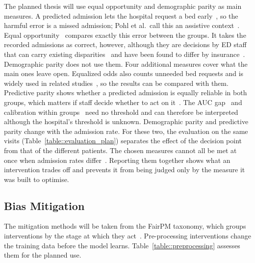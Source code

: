 The planned thesis will use equal opportunity and demographic parity as main measures. A predicted admission lets the hospital request a bed early~\cite{lett2025intersectional}, so the harmful error is a missed admission; Pohl et al.\ call this an assistive context~\cite{pohl2023discrimination}. Equal opportunity~\cite{hardt2016equality} compares exactly this error between the groups. It takes the recorded admissions as correct, however, although they are decisions by ED staff that can carry existing disparities~\cite{rajkomar2018ensuring} and have been found to differ by insurance~\cite{venkatesh2019association}. Demographic parity does not use them. Four additional measures cover what the main ones leave open. Equalized odds also counts unneeded bed requests and is widely used in related studies~\cite{liu2024faim,dasilva2025towards}, so the results can be compared with them. Predictive parity shows whether a predicted admission is equally reliable in both groups, which matters if staff decide whether to act on it~\cite{rajkomar2018ensuring}. The AUC gap~\cite{roosli2022peeking} and calibration within groups~\cite{pfohl2021empirical} need no threshold and can therefore be interpreted although the hospital's threshold is unknown. Demographic parity and predictive parity change with the admission rate. For these two, the evaluation on the same visits (Table~\ref{table::evaluation_plan}) separates the effect of the decision point from that of the different patients. The chosen measures cannot all be met at once when admission rates differ~\cite{paulus2020predictably}. Reporting them together shows what an intervention trades off and prevents it from being judged only by the measure it was built to optimise.

\subsection{Bias Mitigation}\label{subsection::mitigation}

The mitigation methods will be taken from the FairPM taxonomy, which groups interventions by the stage at which they act~\cite{revoredo2026fairpm}. Pre-processing interventions change the training data before the model learns. Table~\ref{table::preprocessing} assesses them for the planned use.

